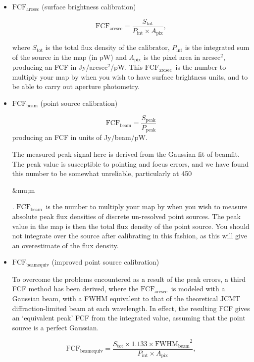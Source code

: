 \documentclass[twoside,11pt]{article}
\newcommand{\micron}{\mbox{\,${\umu}$m}}            %
\newcommand{\xref}[3]{#1}
\renewcommand{\_}{\texttt{\symbol{95}}}
\newcommand{\fcfbe}{$\mathrm{FCF_{beamequiv}}$}
\newcommand{\fcfb}{$\mathrm{FCF_{beam}}$}
\newcommand{\fcfa}{$\mathrm{FCF_{arcsec}}$}
\newcommand{\task}[1]{\textsf{#1}}
\newcommand{\beamfit}{\xref{\task{beamfit}}{sun95}{BEAMFIT}}
\renewcommand{\micron}{\begin{rawhtml}&mu;m\end{rawhtml}}
\begin{document}
\begin{itemize}

\item{\textbf{\fcfa} (surface brightness calibration)}

\begin{equation}
\label{eq:fcf_arcsec}
\mathrm{FCF_{arcsec}} = \frac{S_\mathrm{tot}}{P_\mathrm{int} \times
  A_\mathrm{pix}},
\end{equation}

where $S_\mathrm{tot}$ is the total flux density of the calibrator,
$P_\mathrm{int}$ is the integrated sum of the source in the map (in
pW) and $A_\mathrm{pix}$ is the pixel area in arcsec$^2$, producing an
FCF in Jy/arcsec$^2$/pW. This \fcfa\ is the number to
multiply your map by when you wish to have surface brightness units,
and to be able to carry out aperture photometry.

\item{\textbf{\fcfb} (point source calibration)}

\begin{equation}
\label{eq:fcf_beam}
\mathrm{FCF_{beam}} = \frac{S_\mathrm{{peak}}}{P_\mathrm{peak}}
\end{equation}
producing an FCF in units of Jy/beam/pW.

The measured peak signal here is derived from the Gaussian fit of
\beamfit. The peak value is susceptible to pointing and focus errors,
and we have found this number to be somewhat unreliable, particularly
at 450\micron. \fcfb\ is the number to multiply your
map by when you wish to measure absolute peak flux densities of
discrete un-resolved point sources. The peak value in the map is then
the total flux density of the point source. You should not integrate
over the source after calibrating in this fashion, as this will give
an overestimate of the flux density.

\item{\textbf{\fcfbe} (improved point source calibration)}

To overcome the problems encountered as a result of the peak errors, a
third FCF method has been derived, where the \fcfa\
is modeled with a Gaussian beam, with a FWHM equivalent to that of the
theoretical JCMT diffraction-limited beam at each wavelength. In
effect, the resulting FCF gives an `equivalent peak' FCF from the
integrated value, assuming that the point source is a perfect
Gaussian.

\begin{equation}
\label{eq:fcf_beamequiv}
\mathrm{FCF_{beamequiv}} = \frac{S_\mathrm{tot} \times 1.133 \times
  {\mathrm{FWHM_{beam}}}^2}{P_\mathrm{int} \times A_\mathrm{pix}},
\end{equation}


\end{itemize}
\end{document}

